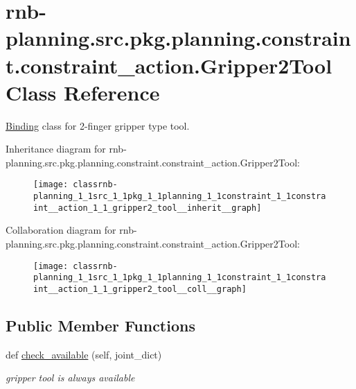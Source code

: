 \hypertarget{classrnb-planning_1_1src_1_1pkg_1_1planning_1_1constraint_1_1constraint__action_1_1_gripper2_tool}{}\section{rnb-\/planning.src.\+pkg.\+planning.\+constraint.\+constraint\+\_\+action.\+Gripper2\+Tool Class Reference}
\label{classrnb-planning_1_1src_1_1pkg_1_1planning_1_1constraint_1_1constraint__action_1_1_gripper2_tool}


\hyperlink{classrnb-planning_1_1src_1_1pkg_1_1planning_1_1constraint_1_1constraint__action_1_1_binding}{Binding} class for 2-\/finger gripper type tool.  




Inheritance diagram for rnb-\/planning.src.\+pkg.\+planning.\+constraint.\+constraint\+\_\+action.\+Gripper2\+Tool\+:\nopagebreak
\begin{figure}[H]
\begin{center}
\leavevmode
\texttt{[image: classrnb-planning\_1\_1src\_1\_1pkg\_1\_1planning\_1\_1constraint\_1\_1constraint\_\_action\_1\_1\_gripper2\_tool\_\_inherit\_\_graph]}
\end{center}
\end{figure}


Collaboration diagram for rnb-\/planning.src.\+pkg.\+planning.\+constraint.\+constraint\+\_\+action.\+Gripper2\+Tool\+:\nopagebreak
\begin{figure}[H]
\begin{center}
\leavevmode
\texttt{[image: classrnb-planning\_1\_1src\_1\_1pkg\_1\_1planning\_1\_1constraint\_1\_1constraint\_\_action\_1\_1\_gripper2\_tool\_\_coll\_\_graph]}
\end{center}
\end{figure}
\subsection*{Public Member Functions}
\begin{DoxyCompactItemize}
\item 
\mbox{\label{classrnb-planning_1_1src_1_1pkg_1_1planning_1_1constraint_1_1constraint__action_1_1_gripper2_tool_a84d9efc98a2fd3a7563754bc107896c2}} 
def \hyperlink{classrnb-planning_1_1src_1_1pkg_1_1planning_1_1constraint_1_1constraint__action_1_1_gripper2_tool_a84d9efc98a2fd3a7563754bc107896c2}{check\+\_\+available} (self, joint\+\_\+dict)
\begin{DoxyCompactList}\small\item\em gripper tool is always available \end{DoxyCompactList}\end{DoxyCompactItemize}
